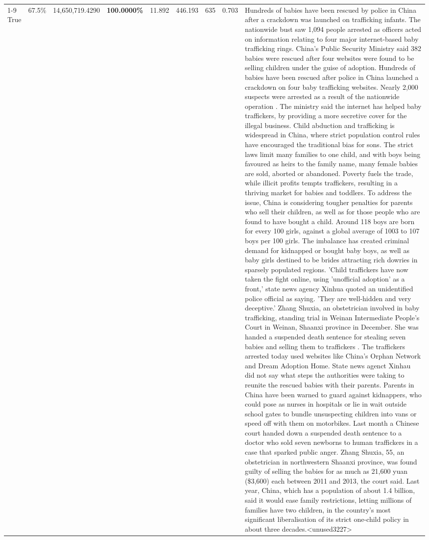 \begin{table}[H]
\begin{tabular}{lllrlllll}
\cline{1-9}
True & 67.5\% & 14,650,719.4290 & \bfseries \color{red} 100.0000\% & 11.892 & 446.193 & 635 & 0.703 & Hundreds of babies have been rescued by police in China after a crackdown was launched on trafficking infants. The nationwide bust saw 1,094 people arrested as officers acted on information relating to four major internet-based baby trafficking rings. China's Public Security Ministry said 382 babies were rescued after four websites were found to be selling children under the guise of adoption. Hundreds of babies have been rescued after police in China launched a crackdown on four baby trafficking websites. Nearly 2,000 suspects were arrested as a result of the nationwide operation . The ministry said the internet has helped baby traffickers, by providing a more secretive cover for the illegal business. Child abduction and trafficking is widespread in China, where strict population control rules have encouraged the traditional bias for sons. The strict laws limit many families to one child, and with boys being favoured as heirs to the family name, many female babies are sold, aborted or abandoned. Poverty fuels the trade, while illicit profits tempts traffickers, resulting in a thriving market for babies and toddlers. To address the issue, China is considering tougher penalties for parents who sell their children, as well as for those people who are found to have bought a child. Around 118 boys are born for every 100 girls, against a global average of 1003 to 107 boys per 100 girls. The imbalance has created criminal demand for kidnapped or bought baby boys, as well as baby girls destined to be brides attracting rich dowries in sparsely populated regions. 'Child traffickers have now taken the fight online, using 'unofficial adoption' as a front,' state news agency Xinhua quoted an unidentified police official as saying. 'They are well-hidden and very deceptive.' Zhang Shuxia, an obstetrician involved in baby trafficking, standing trial in Weinan Intermediate People's Court in Weinan, Shaanxi province in December. She was handed a suspended death sentence for stealing seven babies and selling them to traffickers . The traffickers arrested today used websites like China's Orphan Network and Dream Adoption Home. State news agenct Xinhau did not say what steps the authorities were taking to reunite the rescued babies with their parents. Parents in China have been warned to guard against kidnappers, who could pose as nurses in hospitals or lie in wait outside school gates to bundle unsuspecting children into vans or speed off with them on motorbikes. Last month a Chinese court handed down a suspended death sentence to a doctor who sold seven newborns to human traffickers in a case that sparked public anger. Zhang Shuxia, 55, an obstetrician in northwestern Shaanxi province, was found guilty of selling the babies for as much as 21,600 yuan (\$3,600) each between 2011 and 2013, the court said. Last year, China, which has a population of about 1.4 billion, said it would ease family restrictions, letting millions of families have two children, in the country's most significant liberalisation of its strict one-child policy in about three decades.<unused3227> \\

\end{tabular}
\end{table}
